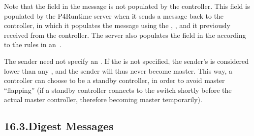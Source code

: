 \documentclass[11pt]{article}
\begin{document}
{%
\noindent{}Note that the  field in the  message is not
populated by the controller. This field is populated by the P4Runtime server
when it sends a  message back to the controller, in which
it populates the  message using the ,
, and  it previously received from the controller. The server
also populates the  field in the  according to
the rules in an~.%

The sender need not specify an . If the  is not
specified, the sender's  is considered lower than any
, and the sender will thus never become master. This way, a
controller can choose to be a standby controller, in order to avoid master
\textquotedblleft{}flapping\textquotedblright{} (if a standby controller connects to the switch shortly before the
actual master controller, therefore becoming master temporarily).%

\subsection{16.3.\hspace*{0.5em}Digest Messages}\label{sec-digest-messages}%

}
\end{document}
